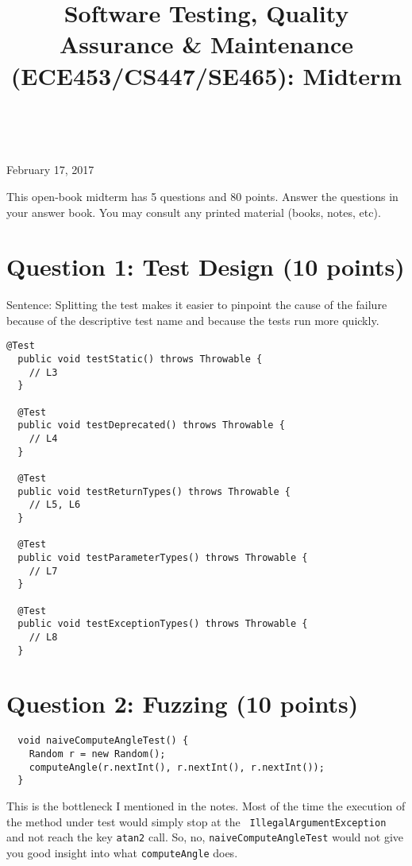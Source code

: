 \documentclass[12pt]{article}
\begin{document}
\title{Software Testing, Quality Assurance \& Maintenance (ECE453/CS447/SE465): Midterm}
\author{}
\renewcommand{\today}{}
\maketitle

 ~\\[-7em]

\begin{center}
{\Large February 17, 2017}
\end{center}

This open-book midterm has 5 questions and 80 points. Answer the
questions in your answer book. You may consult any printed material
(books, notes, etc).


\section*{Question 1: Test Design (10 points)}
Sentence: Splitting the test makes it easier to pinpoint the cause of the failure
because of the descriptive test name and because the tests run more quickly.

\begin{lstlisting}[basicstyle=\scriptsize \ttfamily]
  @Test
  public void testStatic() throws Throwable {
    // L3
  }

  @Test
  public void testDeprecated() throws Throwable {
    // L4
  }

  @Test
  public void testReturnTypes() throws Throwable {
    // L5, L6
  }

  @Test
  public void testParameterTypes() throws Throwable {
    // L7
  }

  @Test
  public void testExceptionTypes() throws Throwable {
    // L8
  }
\end{lstlisting}

\newpage
\section*{Question 2: Fuzzing (10 points)}
\begin{lstlisting}
  void naiveComputeAngleTest() {
    Random r = new Random();
    computeAngle(r.nextInt(), r.nextInt(), r.nextInt());
  }
\end{lstlisting}
This is the bottleneck I mentioned in the notes. Most of the time the
execution of the method under test would simply stop at the {\tt
  IllegalArgumentException} and not reach the key {\tt atan2} call. So, no,
{\tt naiveComputeAngleTest} would not give you good insight into what
{\tt computeAngle} does.
\end{document}

